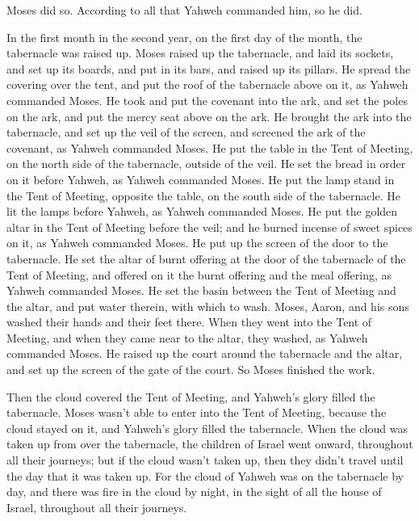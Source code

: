 {Moses did so. According to all that Yahweh commanded him, so he did.
\par }{\PP {}In the first month in the second year, on the first day of the month, the tabernacle was raised up.
Moses raised up the tabernacle, and laid its sockets, and set up its boards, and put in its bars, and raised up its pillars.
He spread the covering over the tent, and put the roof of the tabernacle above on it, as Yahweh commanded Moses.
He took and put the covenant into the ark, and set the poles on the ark, and put the mercy seat above on the ark.
He brought the ark into the tabernacle, and set up the veil of the screen, and screened the ark of the covenant, as Yahweh commanded Moses.
He put the table in the Tent of Meeting, on the north side of the tabernacle, outside of the veil.
He set the bread in order on it before Yahweh, as Yahweh commanded Moses.
He put the lamp stand in the Tent of Meeting, opposite the table, on the south side of the tabernacle.
He lit the lamps before Yahweh, as Yahweh commanded Moses.
He put the golden altar in the Tent of Meeting before the veil;
and he burned incense of sweet spices on it, as Yahweh commanded Moses.
He put up the screen of the door to the tabernacle.
He set the altar of burnt offering at the door of the tabernacle of the Tent of Meeting, and offered on it the burnt offering and the meal offering, as Yahweh commanded Moses.
He set the basin between the Tent of Meeting and the altar, and put water therein, with which to wash.
Moses, Aaron, and his sons washed their hands and their feet there.
When they went into the Tent of Meeting, and when they came near to the altar, they washed, as Yahweh commanded Moses.
He raised up the court around the tabernacle and the altar, and set up the screen of the gate of the court. So Moses finished the work.
\par }{\PP {}Then the cloud covered the Tent of Meeting, and Yahweh’s glory filled the tabernacle.
Moses wasn’t able to enter into the Tent of Meeting, because the cloud stayed on it, and Yahweh’s glory filled the tabernacle.
When the cloud was taken up from over the tabernacle, the children of Israel went onward, throughout all their journeys;
but if the cloud wasn’t taken up, then they didn’t travel until the day that it was taken up.
For the cloud of Yahweh was on the tabernacle by day, and there was fire in the cloud by night, in the sight of all the house of Israel, throughout all their journeys.
\par }
